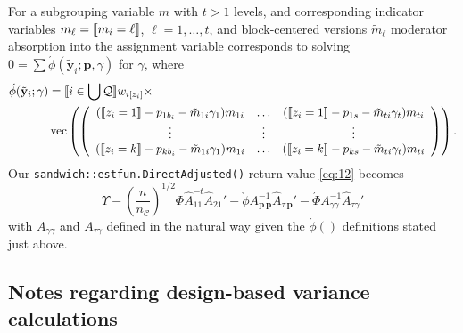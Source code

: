 \documentclass{article}
\DeclarePairedDelimiter{\indicator}{\llbracket}{\rrbracket}
\newcommand{\owt}[1][z_i]{\ensuremath{w_{i[#1]}}}
\begin{document}
For a subgrouping variable $m$ with $t>1$ levels, and corresponding
indicator variables $m_{\ell} =\indicator{m_{i}=\ell}$, $\ell=1,
\ldots, t$, and block-centered versions $\tilde{m}_{\ell}$  moderator absorption into the assignment variable
corresponds to solving $0 = \sum
\acute{\phi}(\tilde{\mathbf{y}}_{i}; \mathbf{p}, {\gamma})$ for $\gamma$, where
\begin{align}
    \acute{\phi}(\tilde{\mathbf{y}}_{i}; \mathbf{\gamma})
&=
                                                 \indicator{i \in \bigcup \mathcal{Q}} \owt{} \times \nonumber \\
  &\operatorname{vec}  \left(%
                                                 \left(
                                                 \begin{array}{ccc}
                                                   (\indicator{z_{i}=1}-p_{1b_{i}}-\tilde{m}_{1i}\gamma_{1})m_{1i}&\ldots&(\indicator{z_{i}=1}-p_{1s}-\tilde{m}_{ti}\gamma_{t})m_{ti}
                                                   \\
                                                   \vdots & \vdots &
                                                                     \vdots
                                                   \\
                                                   (\indicator{z_{i}=k}-p_{kb_{i}}
                                                   - \tilde{m}_{1i}\gamma_{1})m_{1i}&\ldots&(\indicator{z_{i}=k}-p_{ks}-\tilde{m}_{ti}\gamma_{t})m_{ti}\\                                                 \end{array}
  \right)%
  \right) .  \label{eq:17}
\end{align}
 Our \texttt{sandwich::estfun.DirectAdjusted()} return value
 \eqref{eq:12} becomes
 \begin{equation}
   \label{eq:19}
  \Upsilon -
  \left(\frac{n}{n_{\mathcal{C}}}\right)^{1/2}\Phi
  \hat{A}_{11}^{-t}\hat{A}_{21}' - \grave{\phi}
  A_{\mathbf{p}\,\mathbf{p}}^{-1}\hat{A}_{\tau\,\mathbf{p}}' -
  \acute{\Phi}A_{\gamma \gamma}^{-1}\hat{A}_{\tau \gamma}'
 \end{equation}
with $A_{\gamma \gamma}$ and $A_{\tau \gamma}$ defined in the natural
way given the $\acute{\phi}()$ definitions stated just above. 

\subsection{Notes regarding design-based variance calculations}
\end{document}
